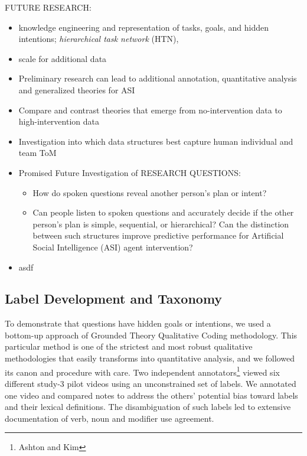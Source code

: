 \documentclass[10pt]{article}
\begin{document}
FUTURE RESEARCH:
\begin{itemize}
    \item knowledge engineering and representation of tasks, goals, and hidden intentions;  \emph{hierarchical task network} (HTN),
    \item scale for additional data
    \item Preliminary research can lead to additional annotation, quantitative analysis and generalized theories for ASI
    \item Compare and contrast theories that emerge from no-intervention data to high-intervention data
    \item Investigation into which data structures best capture human individual and team ToM
        \item Promised Future Investigation of RESEARCH QUESTIONS:
        \begin{itemize}
        \item How do spoken questions reveal another person’s plan or intent? 
    \item Can people listen to spoken questions and accurately decide if the other person's plan
        is simple, sequential, or hierarchical? Can the distinction between such
        structures improve predictive performance for Artificial Social
        Intelligence (ASI) agent intervention?
        \end{itemize}
        \item asdf
\end{itemize}








\vspace{300pt}
\subsection{Label Development and Taxonomy}

To demonstrate that questions have hidden goals or intentions, we used a bottom-up approach of Grounded Theory Qualitative Coding methodology. This particular method is one of the strictest and most robust qualitative methodologies that easily transforms into quantitative analysis, and we followed its canon and procedure with care. Two independent annotators\footnote{Ashton and Kim} viewed six different study-3 pilot videos using an unconstrained set of labels. We annotated one video and compared notes to address the others' potential bias toward labels and their lexical definitions. The disambiguation of such labels led to extensive documentation of verb, noun and modifier use agreement. 
\end{document}
